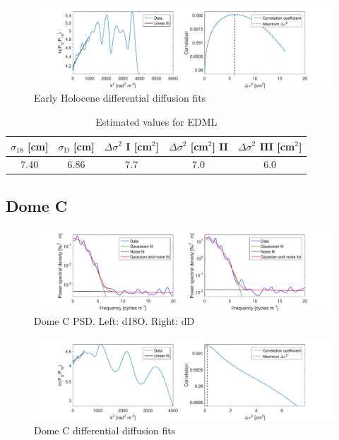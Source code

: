 \documentclass[11pt, draftcls, onecolumn]{IEEEtran} %
\numberwithin{equation}{section}
\numberwithin{table}{section}
\numberwithin{figure}{section}
\begin{document}
\begin{appendices}
\begin{figure}[H]
	\vspace*{2mm}
	\begin{center}
		\includegraphics[width=1\textwidth]{Figure_30}
		\caption{Early Holocene differential diffusion fits}  \label{fig:EDML_fig_2}
	\end{center}
\end{figure}

\begin{table}[H]
	\center
	\caption{Estimated values for EDML}
	\label{EDML}
	\begin{tabular}{c c c c c} 
		\toprule
		$\sigma_{18}$ [cm] & $\sigma_\mathrm{D}$ [cm] & $\Delta\sigma^2$ I [cm$^2$] & $\Delta\sigma^2$ [cm$^2$] II & $\Delta\sigma^2$ III [cm$^2$] \\
		\midrule
 		 7.40 &   6.86 &     7.7 &     7.0 &     6.0 \\
		\bottomrule		
	\end{tabular}
\end{table}


\clearpage
\subsection{Dome C}

\begin{figure}[H]
	\vspace*{2mm}
	\centering
	\includegraphics[width=1\textwidth]{Figure_31}
	\caption{Dome C PSD. Left: d18O. Right: dD}  \label{fig:DomeC_fig_1}
\end{figure}

\begin{figure}[H]
	\vspace*{2mm}
	\begin{center}
		\includegraphics[width=1\textwidth]{Figure_32}
		\caption{Dome C differential diffusion fits}  \label{fig:DomeC_fig_2}
	\end{center}
\end{figure}


\end{appendices}
\end{document}

